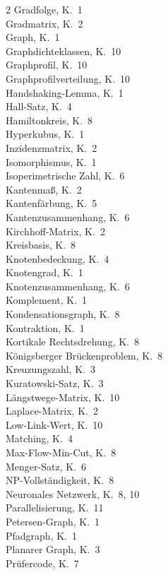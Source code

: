 ﻿\documentclass[a4paper,12pt,openany,oneside]{book}
\theoremstyle{definition}
\theoremstyle{plain}
\theoremstyle{remark}
\begin{document}
\begin{multicols}{2}
Gradfolge, K.~1 \\
Gradmatrix, K.~2 \\
Graph, K.~1 \\
Graphdichteklassen, K.~10 \\
Graphprofil, K.~10 \\
Graphprofilverteilung, K.~10 \\
Handshaking-Lemma, K.~1 \\
Hall-Satz, K.~4 \\
Hamiltonkreis, K.~8 \\
Hyperkubus, K.~1 \\
Inzidenzmatrix, K.~2 \\
Isomorphismus, K.~1 \\
Isoperimetrische Zahl, K.~6 \\
Kantenma\ss{}, K.~2 \\
Kantenf\"arbung, K.~5 \\
Kantenzusammenhang, K.~6 \\
Kirchhoff-Matrix, K.~2 \\
Kreisbasis, K.~8 \\
Knotenbedeckung, K.~4 \\
Knotengrad, K.~1 \\
Knotenzusammenhang, K.~6 \\
Komplement, K.~1 \\
Kondensationsgraph, K.~8 \\
Kontraktion, K.~1 \\
Kortikale Rechtsdrehung, K.~8 \\
K\"onigsberger Br\"uckenproblem, K.~8 \\
Kreuzungszahl, K.~3 \\
Kuratowski-Satz, K.~3 \\
L\"angstwege-Matrix, K.~10 \\
Laplace-Matrix, K.~2 \\
Low-Link-Wert, K.~10 \\
Matching, K.~4 \\
Max-Flow-Min-Cut, K.~8 \\
Menger-Satz, K.~6 \\
NP-Vollst\"andigkeit, K.~8 \\
Neuronales Netzwerk, K.~8, 10 \\
Parallelisierung, K.~11 \\
Petersen-Graph, K.~1 \\
Pfadgraph, K.~1 \\
Planarer Graph, K.~3 \\
Pr\"ufercode, K.~7 \\

\end{multicols}
\end{document}
